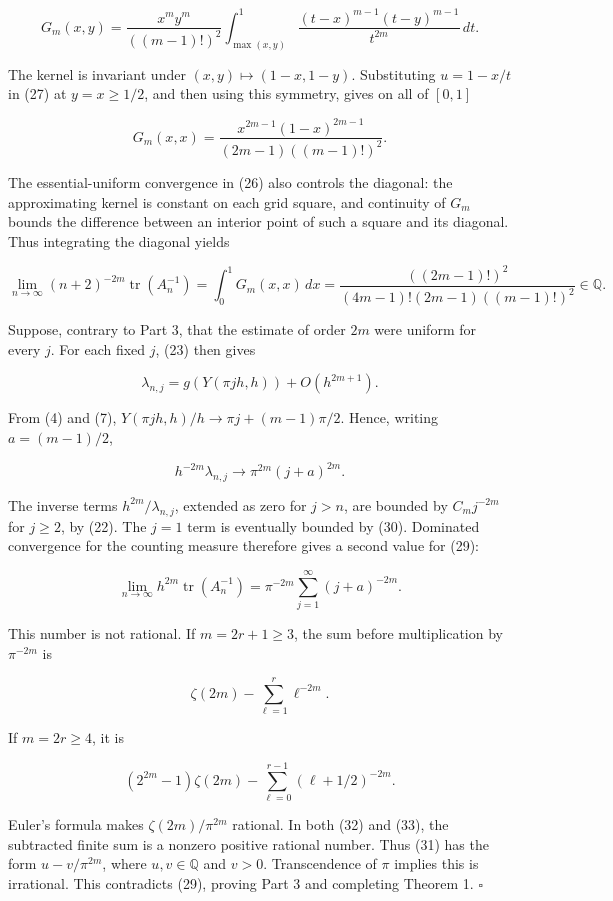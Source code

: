 \documentclass[10pt,a4paper]{article}
\begin{document}
\nopagebreak[3]
\[
G_m(x,y)=\frac{x^m y^m}{((m-1)!)^2}
\int_{\max(x,y)}^1\frac{(t-x)^{m-1}(t-y)^{m-1}}{t^{2m}}\,dt.
\tag{27}
\]

The kernel is invariant under \((x,y)\mapsto(1-x,1-y)\). Substituting \(u=1-x/t\) in (27) at \(y=x\ge1/2\), and then using this symmetry, gives on all of \([0,1]\)

\nopagebreak[3]
\[
G_m(x,x)=\frac{x^{2m-1}(1-x)^{2m-1}}{(2m-1)((m-1)!)^2}.
\tag{28}
\]

The essential-uniform convergence in (26) also controls the diagonal: the approximating kernel is constant on each grid square, and continuity of \(G_m\) bounds the difference between an interior point of such a square and its diagonal. Thus integrating the diagonal yields

\nopagebreak[3]
\[
\lim_{n\to\infty}(n+2)^{-2m}\operatorname{tr}(A_n^{-1})
=\int_0^1G_m(x,x)\,dx
=\frac{((2m-1)!)^2}{(4m-1)!(2m-1)((m-1)!)^2}
\in\mathbb Q.
\tag{29}
\]

Suppose, contrary to Part 3, that the estimate of order \(2m\) were uniform for every \(j\). For each fixed \(j\), (23) then gives

\nopagebreak[3]
\[
\lambda_{n,j}=g(Y(\pi jh,h))+O(h^{2m+1}).
\]

From (4) and (7), \(Y(\pi jh,h)/h\to\pi j+(m-1)\pi/2\). Hence, writing \(a=(m-1)/2\),

\nopagebreak[3]
\[
h^{-2m}\lambda_{n,j}\longrightarrow \pi^{2m}(j+a)^{2m}.
\tag{30}
\]

The inverse terms \(h^{2m}/\lambda_{n,j}\), extended as zero for \(j>n\), are bounded by \(C_m j^{-2m}\) for \(j\ge2\), by (22). The \(j=1\) term is eventually bounded by (30). Dominated convergence for the counting measure therefore gives a second value for (29):

\nopagebreak[3]
\[
\lim_{n\to\infty}h^{2m}\operatorname{tr}(A_n^{-1})
=\pi^{-2m}\sum_{j=1}^{\infty}(j+a)^{-2m}.
\tag{31}
\]

This number is not rational. If \(m=2r+1\ge3\), the sum before multiplication by \(\pi^{-2m}\) is

\nopagebreak[3]
\[
\zeta(2m)-\sum_{\ell=1}^{r}\ell^{-2m}.
\tag{32}
\]

If \(m=2r\ge4\), it is

\nopagebreak[3]
\[
(2^{2m}-1)\zeta(2m)-\sum_{\ell=0}^{r-1}(\ell+1/2)^{-2m}.
\tag{33}
\]

Euler's formula makes \(\zeta(2m)/\pi^{2m}\) rational. In both (32) and (33), the subtracted finite sum is a nonzero positive rational number. Thus (31) has the form \(u-v/\pi^{2m}\), where \(u,v\in\mathbb Q\) and \(v>0\). Transcendence of \(\pi\) implies this is irrational. This contradicts (29), proving Part 3 and completing Theorem 1. \(\square\)
\end{document}
